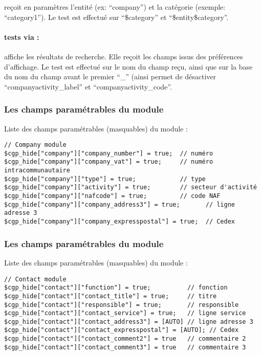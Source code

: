  reçoit en paramètres l'entité (ex: ``company'') et la catégorie (exemple: ``category1'').
Le test est effectué sur ``\$category'' et ``\$entity\$category''.


\paragraph{tests via  :}

 affiche les résultats de recherche. Elle reçoit les champs issus des préférences d'affichage.
Le test est effectué sur le nom du champ reçu, ainsi que sur la base du nom du champ avant le premier ``\_'' (ainsi  permet de désactiver ``companyactivity\_label'' et ``companyactivity\_code''.


\subsubsection{Les champs paramétrables du module \company}

Liste des champs paramétrables (masquables) du module \company :

\begin{verbatim}
// Company module
$cgp_hide["company"]["company_number"] = true;  // numéro
$cgp_hide["company"]["company_vat"] = true;     // numéro intracommunautaire
$cgp_hide["company"]["type"] = true;            // type
$cgp_hide["company"]["activity"] = true;        // secteur d'activité
$cgp_hide["company"]["nafcode"] = true;         // code NAF
$cgp_hide["company"]["company_address3"] = true;       // ligne adresse 3
$cgp_hide["company"]["company_expresspostal"] = true;  // Cedex
\end{verbatim}  


\subsubsection{Les champs paramétrables du module \contact}

Liste des champs paramétrables (masquables) du module \contact :

\begin{verbatim}
// Contact module
$cgp_hide["contact"]["function"] = true;          // fonction
$cgp_hide["contact"]["contact_title"] = true;     // titre
$cgp_hide["contact"]["responsible"] = true;       // responsible
$cgp_hide["contact"]["contact_service"] = true;   // ligne service
$cgp_hide["contact"]["contact_address3"] = [AUTO] // ligne adresse 3
$cgp_hide["contact"]["contact_expresspostal"] = [AUTO]; // Cedex
$cgp_hide["contact"]["contact_comment2"] = true   // commentaire 2
$cgp_hide["contact"]["contact_comment3"] = true   // commentaire 3
\end{verbatim}  


